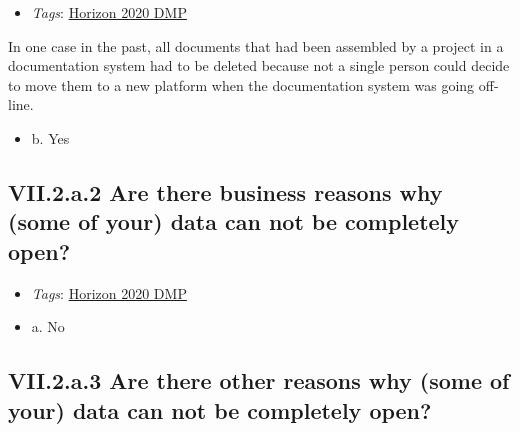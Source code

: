 \documentclass[a4paper,12pt]{report}
\begin{document}
\begin{itemize}
  \item \textit{Tags}: \ul{Horizon 2020 DMP}
  \end{itemize}


\noindent
\begin{markdown}
In one case in the past, all documents that had been assembled by a project in a documentation system had to be deleted because not a single person could decide to move them to a new platform when the documentation system was going off-line.
\end{markdown}



\begin{itemize}
  \item[\CheckmarkBold] b. Yes
\end{itemize}




\subsection*{\protect\textcolor{colorSecId}{VII.2.a.2} Are there business reasons why (some of your) data can not be completely open?}

\label{6be88f7c-f868-460f-bba7-91e1c659adfd.a549d10b-aa46-4c0c-863f-30219ac5ecce.b3739ebd-2d8e-42d3-9425-a7d6d1b26c79.85a9d872-3d41-4560-82c4-b850a6e2d5ac}


\begin{itemize}
  \item \textit{Tags}: \ul{Horizon 2020 DMP}
  \end{itemize}




\begin{itemize}
  \item[\CheckmarkBold] a. No
\end{itemize}




\subsection*{\protect\textcolor{colorSecId}{VII.2.a.3} Are there other reasons why (some of your) data can not be completely open?}
\end{document}
